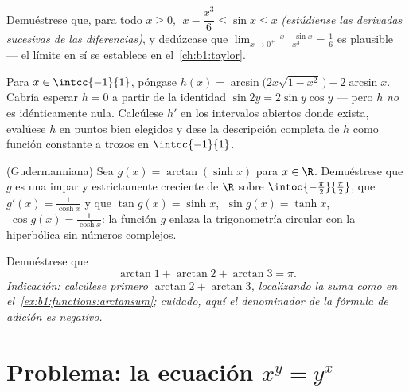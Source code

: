 \begin{exercise}[$\star\star$]\label{exo:b1:functions:9}
Demuéstrese que, para todo $x \geq 0$, $\;x - \dfrac{x^3}{6} \leq \sin x
\leq x$ \emph{(estúdiense las derivadas sucesivas de las diferencias)},
y dedúzcase que $\lim_{x \to 0^+} \frac{x - \sin x}{x^3} = \frac 16$ es
plausible --- el límite en sí se establece en
el~\cref{ch:b1:taylor}.
\end{exercise}

\begin{exercise}[$\star\star\star$]\label{exo:b1:functions:10}
Para $x \in \intcc{-1}{1}$, póngase
$h(x) = \arcsin\bigl(2x\sqrt{1 - x^2}\,\bigr) - 2\arcsin x$. Cabría
esperar $h = 0$ a partir de la identidad $\sin 2y = 2\sin y\cos y$
--- pero $h$ \emph{no} es idénticamente nula. Calcúlese $h'$ en los
intervalos abiertos donde exista, evalúese $h$ en puntos bien elegidos
y dese la descripción completa de $h$ como función constante a trozos
en $\intcc{-1}{1}$.
\end{exercise}

\begin{exercise}[$\star\star\star$]\label{exo:b1:functions:11}
(Gudermanniana) Sea $g(x) = \arctan(\sinh x)$ para $x \in \R$.
Demuéstrese que $g$ es una  impar y estrictamente creciente de
$\R$ sobre $\intoo{-\frac\pi2}{\frac\pi2}$, que $g'(x) =
\frac{1}{\cosh x}$ y que $\tan g(x) = \sinh x$, $\;\sin g(x) = \tanh x$,
$\;\cos g(x) = \frac{1}{\cosh x}$: la función $g$ enlaza la
trigonometría circular con la hiperbólica sin números complejos.
\end{exercise}

\begin{exercise}[$\star\star$]\label{exo:b1:functions:12}
Demuéstrese que
\[
\arctan 1 + \arctan 2 + \arctan 3 = \pi .
\]
\emph{Indicación: calcúlese primero $\arctan 2 + \arctan 3$,
localizando la suma como en el~\cref{ex:b1:functions:arctansum};
cuidado, aquí el denominador de la fórmula de adición es negativo.}
\end{exercise}

\section{Problema: la ecuación $x^y = y^x$}

